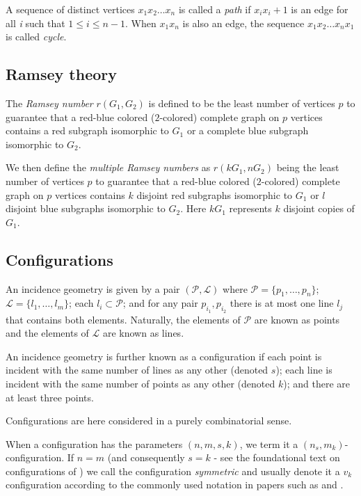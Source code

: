 \documentclass{article}
\theoremstyle{definition}
\theoremstyle{remark}
\theoremstyle{definition}
\begin{document}
A sequence of distinct vertices $x_1 x_2 \ldots x_n$ is called a \textit{path} if $x_i x_i+1$ is an edge for all \textit{i} such that $1\leq i \leq n-1$. When $x_1 x_n$ is also an edge, the sequence $x
_1 x_2 \ldots x_n x_1$ is called \textit{cycle}.

\subsection{Ramsey theory}

The \textit{Ramsey number} $r(G_1,G_2)$ is defined to be the least number of vertices $p$ to guarantee that a red-blue colored ($2$-colored) complete graph on $p$ vertices contains a red subgraph isomorphic to $G_1$ or a complete blue subgraph isomorphic to $G_2$.

We then define the \textit{multiple Ramsey numbers} \cite{burr1975ramsey} as $r(kG_1,nG_2)$ being the least number of vertices $p$ to guarantee that a red-blue colored ($2$-colored) complete graph on $p$ vertices contains $k$ disjoint red subgraphs isomorphic to $G_1$ or $l$ disjoint blue subgraphs isomorphic to $G_2$. Here $kG_1$ represents $k$ disjoint copies of $G_1$.



\subsection{Configurations}

An incidence geometry is given by a pair $(\mathcal{P},\mathcal{L})$ where $\mathcal{P}=\{p_{1}, \ldots , p_{n}\} $; $\mathcal{L}=\{l_{1}, \ldots ,l_{m}\}$; each $l_{i}\subset \mathcal{P}$; and for any pair $p_{i_{1}},p_{i_{2}}$ there is at most one line $l_{j}$ that contains both elements. Naturally, the elements of $\mathcal{P}$ are known as points and the elements of $\mathcal{L}$ are known as lines.

An incidence geometry is further known as a configuration if each point is incident with the same number of lines as any other (denoted $s$); each line is incident with the same number of points as any other (denoted $k$); and there are at least three points.

Configurations are here considered in a purely combinatorial sense.

When a configuration has the parameters $(n,m,s,k)$, we term it a $(n_s,m_k)$-configuration. If $n=m$ (and consequently $s=k$ - see the foundational text on configurations of \cite{grunbaum2009configurations}) we call the configuration \textit{symmetric} and usually denote it a $v_k$ configuration according to the commonly used notation in papers such as \cite{betten2000counting} and \cite{boben2007irreducible}.
\end{document}
